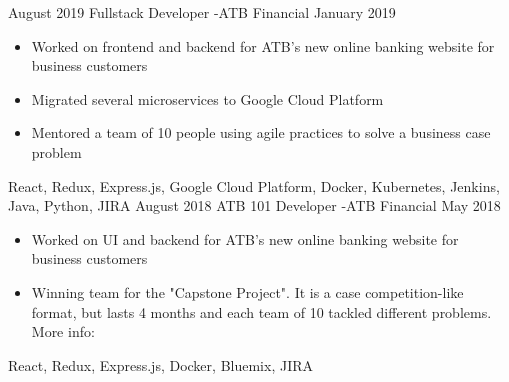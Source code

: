 
\begin{experiences}
  \experience
    {August 2019}   {Fullstack Developer -}{ATB Financial}{}
    {January 2019} {
                      \begin{itemize}
                        \item Worked on frontend and backend for ATB's new online banking website for business customers
                        \item Migrated several microservices to Google Cloud Platform
                        \item Mentored a team of 10 people using agile practices to solve a business case problem
                      \end{itemize}
                    }
                    {
                        React,
                        Redux,
                        Express.js,
                        Google Cloud Platform,
                        Docker,
                        Kubernetes,
                        Jenkins,
                        Java,
                        Python,
                        JIRA
                    }
  \emptySeparator
  \experience
  {August 2018}   {ATB 101 Developer -}{ATB Financial}{}
  {May 2018} {
                    \begin{itemize}
                      \item Worked on UI and backend for ATB's new online banking website for business customers
                      \item Winning team for the "Capstone Project". It is a case competition-like format,
                      but lasts 4 months and each team of 10 tackled different problems.
                      More info: 
                    \end{itemize}
                  }
                  {
                      React,
                      Redux,
                      Express.js,
                      Docker,
                      Bluemix,
                      JIRA
                  }
\end{experiences}
